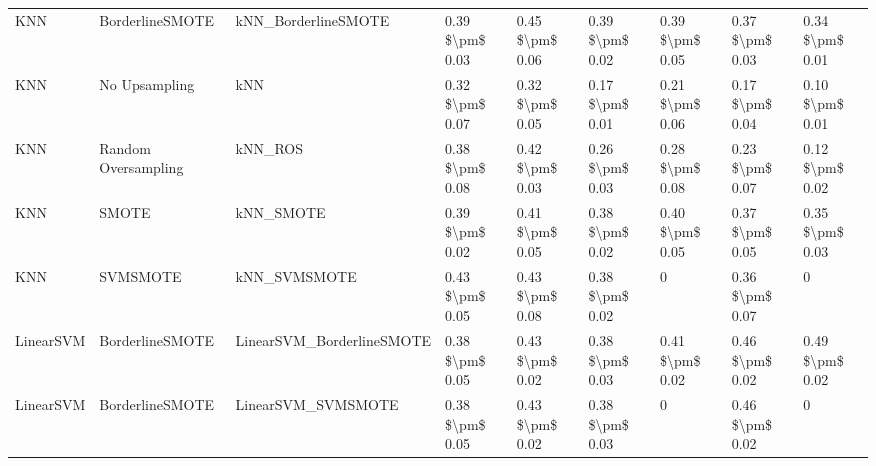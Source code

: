 \begin{tabular}{lllllllll}
                            KNN &               BorderlineSMOTE &                          kNN\_BorderlineSMOTE & 0.39 \$\textbackslash pm\$ 0.03 &           0.45 \$\textbackslash pm\$ 0.06 &       0.39 \$\textbackslash pm\$ 0.02 &        0.39 \$\textbackslash pm\$ 0.05 &                         0.37 \$\textbackslash pm\$ 0.03 &     0.34 \$\textbackslash pm\$ 0.01 \\
                            KNN &                 No Upsampling &                                          kNN & 0.32 \$\textbackslash pm\$ 0.07 &           0.32 \$\textbackslash pm\$ 0.05 &       0.17 \$\textbackslash pm\$ 0.01 &        0.21 \$\textbackslash pm\$ 0.06 &                         0.17 \$\textbackslash pm\$ 0.04 &     0.10 \$\textbackslash pm\$ 0.01 \\
                            KNN &           Random Oversampling &                                      kNN\_ROS & 0.38 \$\textbackslash pm\$ 0.08 &           0.42 \$\textbackslash pm\$ 0.03 &       0.26 \$\textbackslash pm\$ 0.03 &        0.28 \$\textbackslash pm\$ 0.08 &                         0.23 \$\textbackslash pm\$ 0.07 &     0.12 \$\textbackslash pm\$ 0.02 \\
                            KNN &                         SMOTE &                                    kNN\_SMOTE & 0.39 \$\textbackslash pm\$ 0.02 &           0.41 \$\textbackslash pm\$ 0.05 &       0.38 \$\textbackslash pm\$ 0.02 &        0.40 \$\textbackslash pm\$ 0.05 &                         0.37 \$\textbackslash pm\$ 0.05 &     0.35 \$\textbackslash pm\$ 0.03 \\
                            KNN &                      SVMSMOTE &                                 kNN\_SVMSMOTE & 0.43 \$\textbackslash pm\$ 0.05 &           0.43 \$\textbackslash pm\$ 0.08 &       0.38 \$\textbackslash pm\$ 0.02 &                      0 &                         0.36 \$\textbackslash pm\$ 0.07 &                   0 \\
                      LinearSVM &               BorderlineSMOTE &                    LinearSVM\_BorderlineSMOTE & 0.38 \$\textbackslash pm\$ 0.05 &           0.43 \$\textbackslash pm\$ 0.02 &       0.38 \$\textbackslash pm\$ 0.03 &        0.41 \$\textbackslash pm\$ 0.02 &                         0.46 \$\textbackslash pm\$ 0.02 &     0.49 \$\textbackslash pm\$ 0.02 \\
                      LinearSVM &               BorderlineSMOTE &                           LinearSVM\_SVMSMOTE & 0.38 \$\textbackslash pm\$ 0.05 &           0.43 \$\textbackslash pm\$ 0.02 &       0.38 \$\textbackslash pm\$ 0.03 &                      0 &                         0.46 \$\textbackslash pm\$ 0.02 &                   0 \\

\end{tabular}
